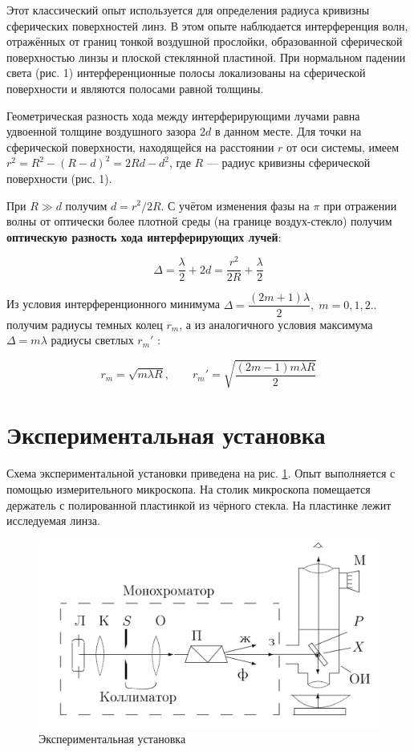 \documentclass[a4paper, 12pt]{article}%
\begin{document}
\item Этот классический опыт используется для определения радиуса кривизны сферических поверхностей линз. В этом опыте наблюдается интерференция волн, отражённых от границ тонкой воздушной прослойки, образованной сферической поверхностью линзы и плоской стеклянной пластиной. При нормальном падении света (рис. 1) интерференционные полосы локализованы на сферической поверхности и являются полосами равной толщины.

\item Геометрическая разность хода между интерферирующими лучами равна удвоенной толщине воздушного зазора $ 2d $ в данном месте. Для точки на сферической поверхности, находящейся на расстоянии $ r $ от оси системы, имеем $ r^2 = R^2 - (R - d)^2 = 2Rd - d^2 $, где $ R $ --- радиус кривизны сферической поверхности (рис. 1).

\item При $ R \gg d $ получим $  d = r^2/2R $. С учётом изменения фазы на $ \pi $ при отражении волны от оптически более плотной среды (на границе воздух-стекло) получим \textbf{оптическую разность хода интерферирующих лучей}:

\[\Delta = \dfrac{\lambda}{2} + 2d = \dfrac{r^2}{2R} + \dfrac{\lambda}{2}\]    	
\item      	 
	
\item Из условия интерференционного минимума $ \Delta = \dfrac{(2m +1)\lambda}{2}, \; m =0, 1, 2.. $ получим радиусы темных колец $ r_m $, а из аналогичного условия максимума $ \Delta = m \lambda $ радиусы светлых $ r_m' $ :
	
\item      
\[r_m = \sqrt{m \lambda R}, \qquad 	r_m' = \sqrt{\dfrac{(2m-1)m \lambda R}{2}}\]  

\newpage
	\section{Экспериментальная установка}
\item Схема экспериментальной установки приведена на рис. \ref{lab}. Опыт выполняется с помощью измерительного микроскопа.
На столик микроскопа помещается держатель с полированной пластинкой из
чёрного стекла. На пластинке лежит исследуемая линза.

	\begin{figure} 
	\includegraphics[width=\linewidth]{lab}
	\caption{Экспериментальная установка}
	\label{lab}
\end{figure}
\end{document}
